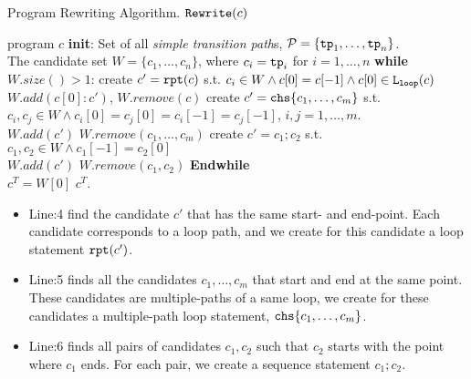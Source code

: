 \begin{algorithm}
 \caption{Program Rewriting Algorithm. $\mathtt{Rewrite}(c)$}
 \label{alg:alg-refine_rewrite}
 \begin{algorithmic}[1]
 \REQUIRE program $c$
 \STATE \textbf{init}: 
 Set of all \emph{simple transition path}s, 
 $\mathcal{P} = \{ \mathtt{tp}_1, \ldots, \mathtt{tp}_n \}$.
 \\
 The candidate set $W = \{c_1, \ldots, c_n\}$, where $c_i = \mathtt{tp}_i$ for $i = 1, \ldots, n$
 \STATE \textbf{while} $W.size()> 1$:
 \STATE
 \quad create $c' = \mathtt{rpt}(c)$ s.t. $c_i \in W \land c[0] = c[-1] \land c[0] \in \mathtt{L}_{\mathtt{loop}}(c)$
 \\ \quad $W.add(c[0]: c')$, \qquad $W.remove(c)$
 \STATE \quad create $c' = \rpchoose{c_1, \ldots, c_m}$ 
 s.t. $c_i, c_j \in W \land c_i[0] = c_j[0] = c_i[-1] = c_j[-1]$, $i, j = 1, \ldots, m$.
 \\ \quad $W.add(c')$ \qquad $W.remove(c_1, \ldots, c_m)$
 \STATE \quad create $c' = c_1; c_2$ s.t. $c_1, c_2 \in W \land c_1[-1] = c_2[0]$
 \\
 \quad $W.add(c')$ \qquad $W.remove(c_1, c_2)$
 \STATE \textbf{Endwhile}
 \\ $c^T = W[0]$
 \RETURN $c^T$.
\end{algorithmic}
\end{algorithm}
%
\begin{itemize}
\item
Line:4 find the candidate $c'$ that has the same start- and end-point.
Each candidate corresponds to a loop path, and we create for this candidate a loop statement
$\mathtt{rpt}(c')$.

\item
 Line:5 
 finds all the candidates $c_1, \ldots, c_m$ that start and end at the same point.
 These candidates are multiple-paths of a same loop, 
 we create for these candidates a multiple-path loop statement,  $\rpchoose{c_1, \ldots, c_m}$.
\item
Line:6 finds all pairs of candidates $c_1, c_2$ such that  $c_2$ starts with the point where $c_1$ ends.
For each pair, we create a sequence statement
 $c_1; c_2$.
\end{itemize}
